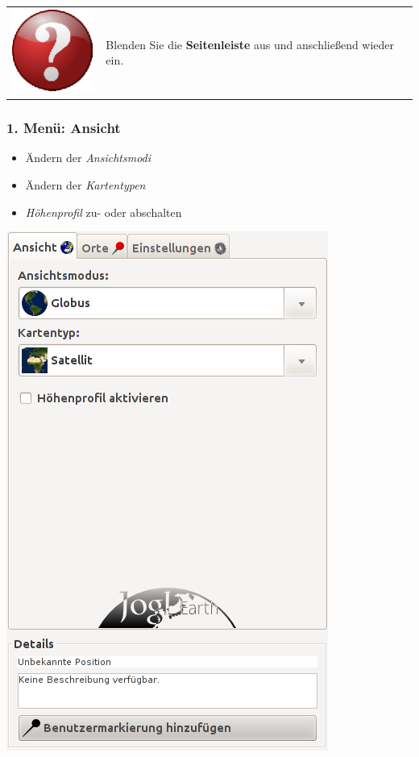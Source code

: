 \documentclass[10pt]{scrreprt}
\newcommand{\textref}[1]{\mbox{\raisebox{0.1ex}{\small$\rightarrow$ }\textit{#1}}}
\begin{document}
\vspace{3mm}
\begin{tabular}{>{\centering \arraybackslash}m{1cm} m{14cm}} \index{Benutzeroberfläche!Seitenleiste} \index{Seitenleiste}
\includegraphics[scale=0.5]{images/quest.eps} & Blenden Sie die \textbf{Seitenleiste} aus und anschließend wieder ein.
\end{tabular}


\vspace{10mm}
\begin{minipage}[t]{9cm}
\vspace{-40mm}
\subsubsection{1. Menü: Ansicht} 
	\begin{itemize}
	\item Ändern der \textref{Ansichtsmodi} 
	\item Ändern der \textref{Kartentypen} 
	\item \textref{Höhenprofil} zu- oder abschalten 
	\end{itemize}
\end{minipage}
\begin{minipage}{7cm}
\centering
\includegraphics[scale=0.35]{images/anzeige_tab.png}
\end{minipage}
\end{document}
